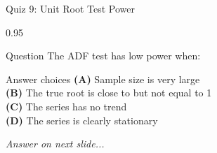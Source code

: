 \documentclass[9pt, aspectratio=169, t]{beamer}
\begin{document}
\begin{frame}{Quiz 9: Unit Root Test Power}
    \begin{cminipage}{0.95\textwidth}
    \begin{alertblock}{Question}
        The ADF test has low power when:
    \end{alertblock}

    \vspace{0.4cm}

    \begin{block}{Answer choices}
        \textcolor{MainBlue}{\textbf{(A)}} Sample size is very large\\[3pt]
        \textcolor{MainBlue}{\textbf{(B)}} The true root is close to but not equal to 1\\[3pt]
        \textcolor{MainBlue}{\textbf{(C)}} The series has no trend\\[3pt]
        \textcolor{MainBlue}{\textbf{(D)}} The series is clearly stationary
    \end{block}

    \vspace{0.5cm}

    \begin{center}
        \textit{Answer on next slide...}
    \end{center}
    \end{cminipage}
\end{frame}
\end{document}
